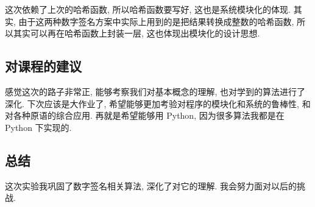 \documentclass[12pt,a4paper]{article}
\begin{document}
这次依赖了上次的哈希函数, 所以哈希函数要写好, 这也是系统模块化的体现. 其实, 由于这两种数字签名方案中实际上用到的是把结果转换成整数的哈希函数, 所以其实可以再在哈希函数上封装一层, 这也体现出模块化的设计思想. 

\subsection*{对课程的建议}

感觉这次的路子非常正, 能够考察我们对基本概念的理解, 也对学到的算法进行了深化. 下次应该是大作业了, 希望能够更加考验对程序的模块化和系统的鲁棒性, 和对各种原语的综合应用. 再就是希望能够用 Python, 因为很多算法我都是在 Python 下实现的. 

\subsection*{总结}

这次实验我巩固了数字签名相关算法, 深化了对它的理解. 我会努力面对以后的挑战. 
\end{document}
